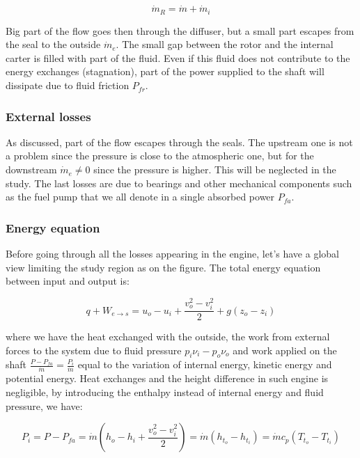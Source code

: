 \begin{equation}
\dot{m}_R = \dot{m} + \dot{m}_i
\end{equation}

Big part of the flow goes then through the diffuser, but a small part escapes from the seal to the outside $\dot{m}_e$. The small gap between the rotor and the internal carter is filled with part of the fluid. Even if this fluid does not contribute to the energy exchanges (stagnation), part of the power supplied to the shaft will dissipate due to fluid friction $P_{fr}$. 

\subsubsection{External losses}
As discussed, part of the flow escapes through the seals. The upstream one is not a problem since the pressure is close to the atmospheric one, but for the downstream $\dot{m}_e \neq 0$ since the pressure is higher. This will be neglected in the study. The last losses are due to bearings and other mechanical components such as the fuel pump that we all denote in a single absorbed power $P_{fa}$. 

\subsubsection{Energy equation}
Before going through all the losses appearing in the engine, let's have a global view limiting the study region as on the figure. The total energy equation between input and output is: 

\begin{equation}
q + W_{e\rightarrow s} = u_o - u_i + \frac{v_o ^2 - v_i^2}{2} + g(z_o - z_i)
\end{equation}

where we have the heat exchanged with the outside, the work from external forces to the system due to fluid pressure $p_i \nu _i - p_o\nu_o$ and work applied on the shaft $\frac{P - P_{fa}}{\dot{m}} =  \frac{P_i}{\dot{m}}$ equal to the variation of internal energy, kinetic energy and potential energy. Heat exchanges and the height difference in such engine is negligible, by introducing the enthalpy instead of internal energy and fluid pressure, we have: 

\begin{equation}
P_i = P - P_{fa} = \dot{m}\left( h_o - h_i + \frac{v_o^2 - v_i^2}{2} \right) = \dot{m} (h_{t_o} - h_{t_i}) = \dot{m} c_p (T_{t_o} - T_{t_i})
\end{equation}

